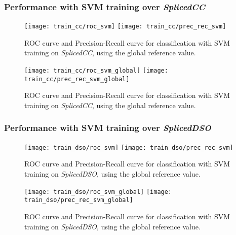 \subsubsection{Performance with SVM training over \emph{SplicedCC}}

\begin{figure}[!htb]
  \texttt{[image: train\_cc/roc\_svm]}
\endminipage\hfill
{}
  \texttt{[image: train\_cc/prec\_rec\_svm]}
\endminipage
\caption{ROC curve and Precision-Recall curve for classification with SVM training on \emph{SplicedCC}, using the global reference value.}\label{fig:regiondetnormal}
\end{figure}

\begin{figure}[!htb]
  \texttt{[image: train\_cc/roc\_svm\_global]}
\endminipage\hfill
{}
  \texttt{[image: train\_cc/prec\_rec\_svm\_global]}
\endminipage
\caption{ROC curve and Precision-Recall curve for classification with SVM training on \emph{SplicedCC}, using the global reference value.}\label{fig:regiondetnormal}
\end{figure}

\subsubsection{Performance with SVM training over \emph{SplicedDSO}}

\begin{figure}[!htb]
  \texttt{[image: train\_dso/roc\_svm]}
\endminipage\hfill
{}
  \texttt{[image: train\_dso/prec\_rec\_svm]}
\endminipage
\caption{ROC curve and Precision-Recall curve for classification with SVM training on \emph{SplicedDSO}, using the global reference value.}\label{fig:regiondetnormal}
\end{figure}

\begin{figure}[!htb]
  \texttt{[image: train\_dso/roc\_svm\_global]}
\endminipage\hfill
{}
  \texttt{[image: train\_dso/prec\_rec\_svm\_global]}
\endminipage
\caption{ROC curve and Precision-Recall curve for classification with SVM training on \emph{SplicedDSO}, using the global reference value.}\label{fig:regiondetnormal}
\end{figure}

